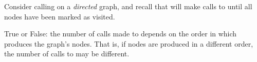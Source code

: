 \begin{prob}
    Consider calling  on a \emph{directed} graph, and recall
    that  will make calls to  until all nodes have been marked as visited.

    True or False: the number of calls made to  depends on the order in which 
    produces the graph's nodes. That is, if nodes are produced in a different order, the number of calls to 
    may be different.

    \Tf{}

\end{prob}
